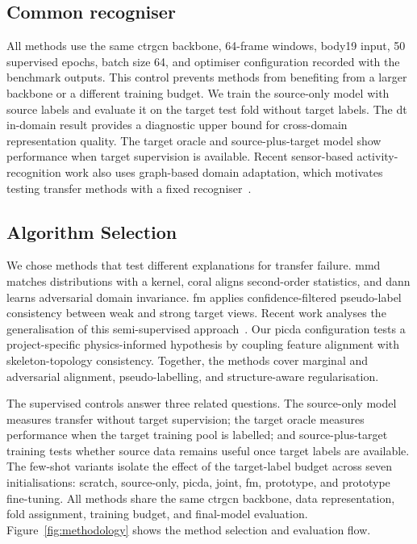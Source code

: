 \documentclass[3p,times,procedia]{elsarticle}
\begin{document}
\subsection{Common recogniser}

All methods use the same \ac{ctrgcn} backbone, 64-frame windows, body19 input,
50 supervised epochs, batch size 64, and optimiser configuration recorded with
the benchmark outputs. This control prevents methods from benefiting from a
larger backbone or a different training budget. We train the source-only model
with source labels and evaluate it on the target test fold without target
labels. The \acs{dt} in-domain result provides a diagnostic upper bound for
cross-domain representation quality. The target oracle and source-plus-target
model show performance when target supervision is available. Recent
sensor-based activity-recognition work also uses graph-based domain adaptation,
which motivates testing transfer methods with a fixed
recogniser~\cite{yang2024domainhar}.

\subsection{Algorithm Selection}

We chose methods that test different explanations for transfer failure.
\ac{mmd} matches distributions with a kernel, \ac{coral} aligns second-order
statistics, and \ac{dann} learns adversarial domain invariance. \ac{fm} applies
confidence-filtered pseudo-label consistency between weak and strong target
views. Recent work analyses the generalisation of this semi-supervised
approach~\cite{li2024fixmatchanalysis}. Our \ac{picda} configuration tests a
project-specific physics-informed hypothesis by coupling feature alignment
with skeleton-topology consistency. Together, the methods cover marginal and
adversarial alignment, pseudo-labelling, and structure-aware regularisation.

The supervised controls answer three related questions. The source-only model
measures transfer without target supervision; the target oracle measures
performance when the target training pool is labelled; and source-plus-target
training tests whether source data remains useful once target labels are
available. The few-shot variants isolate the effect of the target-label budget
across seven initialisations: scratch, source-only, \ac{picda}, joint,
\ac{fm}, prototype, and prototype fine-tuning. All methods share the same
\ac{ctrgcn} backbone, data representation, fold assignment, training budget,
and final-model evaluation. Figure~\ref{fig:methodology} shows the method
selection and evaluation flow.
\end{document}
